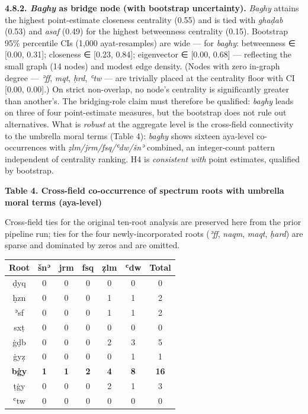 \textbf{4.8.2. \emph{Baghy} as bridge node (with bootstrap
uncertainty).} \emph{Baghy} attains the highest point-estimate closeness
centrality (0.55) and is tied with \emph{ghaḍab} (0.53) and \emph{asaf}
(0.49) for the highest betweenness centrality (0.15). Bootstrap 95\%
percentile CIs (1,000 ayat-resamples) are wide --- for \emph{baghy}:
betweenness ∈ {[}0.00, 0.31{]}; closeness ∈ {[}0.23, 0.84{]};
eigenvector ∈ {[}0.00, 0.68{]} --- reflecting the small graph (14 nodes)
and modest edge density. (Nodes with zero in-graph degree ---
\emph{ʾff}, \emph{mqt}, \emph{ḥrd}, \emph{ʿtw} --- are trivially placed
at the centrality floor with CI {[}0.00, 0.00{]}.) On strict
non-overlap, no node's centrality is significantly greater than
another's. The bridging-role claim must therefore be qualified:
\emph{baghy} leads on three of four point-estimate measures, but the
bootstrap does not rule out alternatives. What is \emph{robust} at the
aggregate level is the cross-field connectivity to the umbrella moral
terms (Table 4): \emph{baghy} shows sixteen aya-level co-occurrences
with \emph{ẓlm/jrm/fsq/ʿdw/šnʾ} combined, an integer-count pattern
independent of centrality ranking. H4 is \emph{consistent with} point
estimates, qualified by bootstrap.

\textbf{Table 4. Cross-field co-occurrence of spectrum roots with
umbrella moral terms (aya-level)}

Cross-field ties for the original ten-root analysis are preserved here
from the prior pipeline run; ties for the four newly-incorporated roots
(\emph{ʾff}, \emph{naqm}, \emph{maqt}, \emph{ḥard}) are sparse and
dominated by zeros and are omitted.

\begin{longtable}[]{@{}ccccccc@{}}
\toprule\noalign{}
Root & šnʾ & jrm & fsq & ẓlm & ʿdw & Total \\
\midrule\noalign{}
\endhead
\bottomrule\noalign{}
\endlastfoot
ḍyq & 0 & 0 & 0 & 0 & 0 & 0 \\
ḥzn & 0 & 0 & 0 & 1 & 1 & 2 \\
ʾsf & 0 & 0 & 0 & 1 & 1 & 2 \\
sxṭ & 0 & 0 & 0 & 0 & 0 & 0 \\
ġḍb & 0 & 0 & 0 & 2 & 3 & 5 \\
ġyẓ & 0 & 0 & 0 & 0 & 1 & 1 \\
\textbf{bġy} & \textbf{1} & \textbf{1} & \textbf{2} & \textbf{4} &
\textbf{8} & \textbf{16} \\
ṭġy & 0 & 0 & 0 & 2 & 1 & 3 \\
ʿtw & 0 & 0 & 0 & 0 & 0 & 0 \\
\end{longtable}


